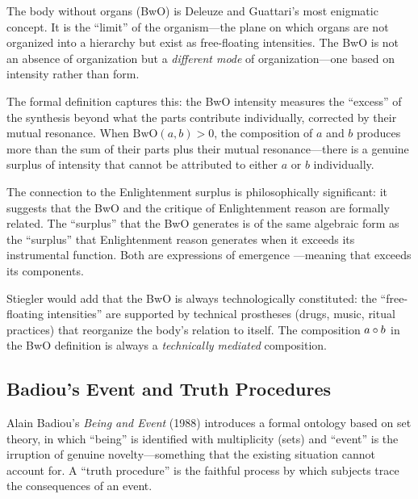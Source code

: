 \begin{interpretation}
The body without organs (BwO) is Deleuze and Guattari's most enigmatic
concept. It is the ``limit'' of the organism---the plane on which organs
are not organized into a hierarchy but exist as free-floating intensities.
The BwO is not an absence of organization but a \emph{different mode} of
organization---one based on intensity rather than form.

The formal definition captures this: the BwO intensity measures the ``excess''
of the synthesis beyond what the parts contribute individually, corrected by
their mutual resonance. When $\mathrm{BwO}(a, b) > 0$, the composition
of $a$ and $b$ produces more than the sum of their parts plus their mutual
resonance---there is a genuine surplus of intensity that cannot be attributed
to either $a$ or $b$ individually.

The connection to the Enlightenment surplus is philosophically significant:
it suggests that the BwO and the critique of Enlightenment reason are
formally related. The ``surplus'' that the BwO generates is of the same
algebraic form as the ``surplus'' that Enlightenment reason generates when
it exceeds its instrumental function. Both are expressions of emergence
---meaning that exceeds its components.

Stiegler would add that the BwO is always technologically constituted:
the ``free-floating intensities'' are supported by technical prostheses
(drugs, music, ritual practices) that reorganize the body's relation to
itself. The composition $a \circ b$ in the BwO definition is always
a \emph{technically mediated} composition.
\end{interpretation}

\subsection{Badiou's Event and Truth Procedures}

Alain Badiou's \textit{Being and Event} (1988) introduces a formal ontology
based on set theory, in which ``being'' is identified with multiplicity
(sets) and ``event'' is the irruption of genuine novelty---something that
the existing situation cannot account for. A ``truth procedure'' is the
faithful process by which subjects trace the consequences of an event.

